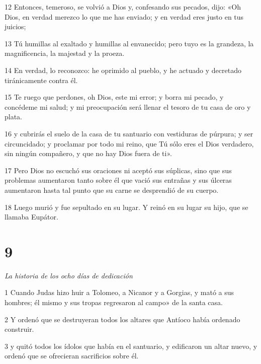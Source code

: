 \par 12 Entonces, temeroso, se volvió a Dios y, confesando sus pecados, dijo: «Oh Dios, en verdad merezco lo que me has enviado; y en verdad eres justo en tus juicios;

\par 13 Tú humillas al exaltado y humillas al envanecido; pero tuyo es la grandeza, la magnificencia, la majestad y la proeza.

\par 14 En verdad, lo reconozco: he oprimido al pueblo, y he actuado y decretado tiránicamente contra él.

\par 15 Te ruego que perdones, oh Dios, este mi error; y borra mi pecado, y concédeme mi salud; y mi preocupación será llenar el tesoro de tu casa de oro y plata.

\par 16 y cubrirás el suelo de la casa de tu santuario con vestiduras de púrpura; y ser circuncidado; y proclamar por todo mi reino, que Tú sólo eres el Dios verdadero, sin ningún compañero, y que no hay Dios fuera de ti».

\par 17 Pero Dios no escuchó sus oraciones ni aceptó sus súplicas, sino que sus problemas aumentaron tanto sobre él que vació sus entrañas y sus úlceras aumentaron hasta tal punto que su carne se desprendió de su cuerpo.

\par 18 Luego murió y fue sepultado en su lugar. Y reinó en su lugar su hijo, que se llamaba Eupátor.

\chapter{9}

\par \textit{La historia de los ocho días de dedicación}

\par 1 Cuando Judas hizo huir a Tolomeo, a Nicanor y a Gorgias, y mató a sus hombres; él mismo y sus tropas regresaron al campo» de la santa casa.

\par 2 Y ordenó que se destruyeran todos los altares que Antíoco había ordenado construir.

\par 3 y quitó todos los ídolos que había en el santuario, y edificaron un altar nuevo, y ordenó que se ofrecieran sacrificios sobre él.


